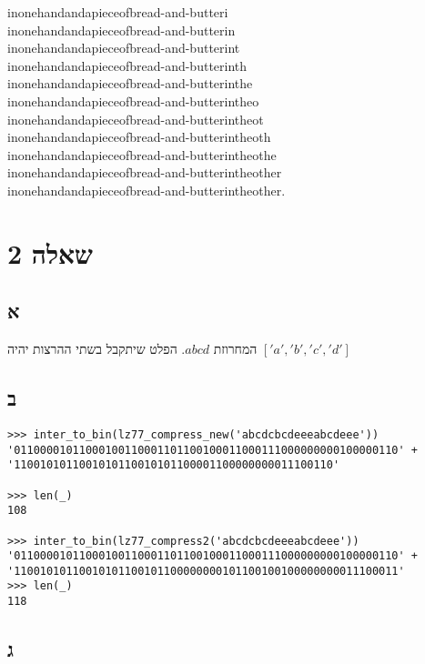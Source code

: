 \documentclass{article}
\begin{document}
inonehandandapieceofbread-and-butteri\\
inonehandandapieceofbread-and-butterin\\
inonehandandapieceofbread-and-butterint\\
inonehandandapieceofbread-and-butterinth\\
inonehandandapieceofbread-and-butterinthe\\
inonehandandapieceofbread-and-butterintheo\\
inonehandandapieceofbread-and-butterintheot\\
inonehandandapieceofbread-and-butterintheoth\\
inonehandandapieceofbread-and-butterintheothe\\
inonehandandapieceofbread-and-butterintheother\\
inonehandandapieceofbread-and-butterintheother.\\

\section*{שאלה 2}

\subsection*{א}

המחרוזת $abcd$.
הפלט שיתקבל בשתי ההרצות יהיה $['a', 'b', 'c', 'd']$

\subsection*{ב}

\begin{lstlisting}
>>> inter_to_bin(lz77_compress_new('abcdcbcdeeeabcdeee'))
'01100001011000100110001101100100011000111000000000100000110' + '1100101011001010110010101100001100000000011100110'

>>> len(_)
108

>>> inter_to_bin(lz77_compress2('abcdcbcdeeeabcdeee'))
'01100001011000100110001101100100011000111000000000100000110' + '11001010110010101100101100000000101100100100000000011100011'
>>> len(_)
118
\end{lstlisting}


\subsection*{ג}
\end{document}
